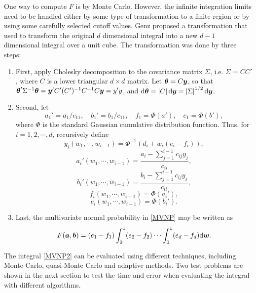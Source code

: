 \documentclass{iitthesis}
\theoremstyle{definition}
\begin{document}
One way to compute $F$ is by Monte Carlo. However, the infinite integration limits need to be handled either by some type of transformation to a finite region or by using some carefully selected cutoff values. Genz \cite{Genz92, GenzBretz02} proposed a transformation that used to transform the original $d$ dimensional integral into a new $d-1$ dimensional integral over a unit cube. The transformation was done by three steps:
\begin{enumerate}
\item First, apply Cholesky decomposition to the covariance matrix $\Sigma$, i.e. $\Sigma = CC'$, where $C$ is a lower triangular $d \times d$ matrix. Let $\boldsymbol{\theta}=C \boldsymbol{y}$, so that $\boldsymbol{\theta}'\Sigma^{-1}\boldsymbol{\theta} = \boldsymbol{y}' C'(C')^{-1} C^{-1}C\boldsymbol{y} =y'y$, and ${\rm d}\boldsymbol{\theta}=\left \lvert C \right \rvert {\rm d} \boldsymbol{y} = \left \lvert \Sigma \right \rvert^{1/2} {\rm d} \boldsymbol{y}$.
\item Second, let
$$a_1'=a_1/c_{11}, \quad b_1'=b_1/c_{11}, \quad f_1=\Phi(a'), \quad  e_1 = \Phi(b'),$$
where $\Phi$ is the standard Gaussian cumulative distribution function. 
Thus, for $i=1,2,\cdots,d$, recursively define
$$y_{i}(w_1,\cdots,w_{i-1}) = \Phi^{-1} (d_i+w_i(e_i-f_i)),$$
$$a_i'(w_1,\cdots,w_{i-1}) = \frac{a_i-\sum_{j=1}^{i-1} c_{ij}y_j}{c_{ii}},$$
$$b_i'(w_1,\cdots,w_{i-1}) = \frac{b_i-\sum_{j=1}^{i-1} c_{ij}y_j}{c_{ii}},$$
$$f_i(w_1,\cdots,w_{i-1}) = \Phi(a_i'),$$
$$e_i(w_1,\cdots,w_{i-1}) = \Phi(b_i').$$
\item Last, the multivariate normal probability in \eqref{MVNP} may be written as 
\begin{equation}\label{MVNP2}
F(\boldsymbol{a},\boldsymbol{b}) = (e_1-f_1)\int_0^1 (e_2-f_2) \cdots \int_0^1(e_d-f_d){\rm d} \boldsymbol{w}.
\end{equation}
\end{enumerate}
The integral \eqref{MVNP2} can be evaluated using different techniques, including Monte Carlo, quasi-Monte Carlo and adaptive methods. Two test problems are shown in the next section to test the time and error when evaluating the integral with different algorithms.
\end{document}
